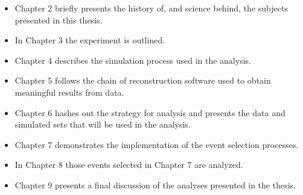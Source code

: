 {\begin{table}[htbp]
\begin{minipage}{0.9\textwidth}
\begin{center}
            \end{center}
        \end{minipage}

    \end{table}

}








\begin{itemize}


\item Chapter 2 briefly presents the history of, and science behind, the
subjects presented in this thesis.

\item In Chapter 3 the experiment is outlined.

\item Chapter 4 describes the simulation process used in the analysis.

\item Chapter 5 follows the chain of reconstruction software used to obtain
meaningful results from data.

\item Chapter 6 hashes out the strategy for analysis and presents the data and
simulated sets that will be used in the analysis.

\item Chapter 7 demonstrates the implementation of the event selection
processes.

\item In Chapter 8 those events selected in Chapter 7 are analyzed.

\item Chapter 9 presents a final discussion of the analyses presented in the
thesis.

\end{itemize}
